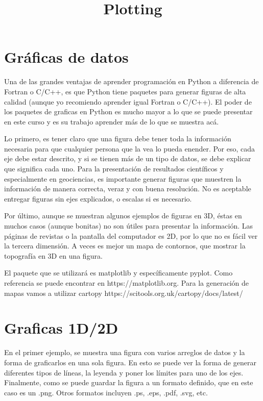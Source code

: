 \documentclass[11pt]{article}
\title{Plotting}
\begin{document}
    
    
    \maketitle
    
    

    
    \hypertarget{gruxe1ficas-de-datos}{%
\section{Gráficas de datos}\label{gruxe1ficas-de-datos}}

Una de las grandes ventajas de aprender programación en Python a
diferencia de Fortran o C/C++, es que Python tiene paquetes para generar
figuras de alta calidad (aunque yo recomiendo aprender igual Fortran o
C/C++). El poder de los paquetes de graficas en Python es mucho mayor a
lo que se puede presentar en este curso y es su trabajo aprender más de
lo que se muestra acá.

Lo primero, es tener claro que una figura debe tener toda la información
necesaria para que cualquier persona que la vea lo pueda enender. Por
eso, cada eje debe estar descrito, y si se tienen más de un tipo de
datos, se debe explicar que significa cada uno. Para la presentación de
resultados científicos y especialmente en geociencias, es importante
generar figuras que muestren la información de manera correcta, veraz y
con buena resolución. No es aceptable entregar figuras sin ejes
explicados, o escalas si es necesario.

Por último, aunque se muestran algunos ejemplos de figuras en 3D, éstas
en muchos casos (aunque bonitas) no son útiles para presentar la
información. Las páginas de revistas o la pantalla del computador es 2D,
por lo que no es fácil ver la tercera dimensión. A veces es mejor un
mapa de contornos, que mostrar la topografía en 3D en una figura.

El paquete que se utilizará es matplotlib y específicamente pyplot. Como
referencia se puede encontrar en https://matplotlib.org. Para la
generación de mapas vamos a utilizar cartopy
https://scitools.org.uk/cartopy/docs/latest/

    \hypertarget{graficas-1d2d}{%
\section{Graficas 1D/2D}\label{graficas-1d2d}}

En el primer ejemplo, se muestra una figura con varios arreglos de datos
y la forma de graficarlos en una sola figura. En esto se puede ver la
forma de generar diferentes tipos de líneas, la leyenda y poner los
límites para uno de los ejes. Finalmente, como se puede guardar la
figura a un formato definido, que en este caso es un .png. Otros
formatos incluyen .ps, .eps, .pdf, .svg, etc.
\end{document}
